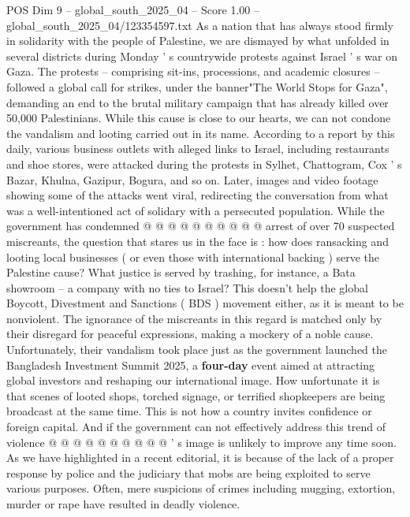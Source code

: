 \begin{textsample}{POS Dim 9 – global\_south\_2025\_04 – Score 1.00 – global\_south\_2025\_04/123354597.txt}  \label{ex:f9_pos_187}
As a nation that has always stood firmly in solidarity with the people of Palestine, we are dismayed by what unfolded in several districts during Monday ' s countrywide protests against Israel ' s war on Gaza.
The protests -- comprising sit-ins, processions, and academic closures -- followed a global call for strikes, under the banner"The World Stops for Gaza", demanding an end to the brutal military campaign that has already killed over 50,000 Palestinians.
While this cause is close to our hearts, we can not condone the vandalism and looting carried out in its name.
According to a report by this daily, various business outlets with alleged links to Israel, including restaurants and shoe stores, were attacked during the protests in Sylhet, Chattogram, Cox ' s Bazar, Khulna, Gazipur, Bogura, and so on.
Later, images and video footage showing some of the attacks went viral, redirecting the conversation from what was a well-intentioned act of solidary with a persecuted population.
While the government has condemned @ @ @ @ @ @ @ @ @ @ arrest of over 70 suspected miscreants, the question that stares us in the face is : how does ransacking and looting local businesses ( or even those with international backing ) serve the Palestine cause?
What justice is served by trashing, for instance, a Bata showroom -- a company with no ties to Israel?
This doesn't help the global Boycott, Divestment and Sanctions ( BDS ) movement either, as it is meant to be nonviolent.
The ignorance of the miscreants in this regard is matched only by their disregard for peaceful expressions, making a mockery of a noble cause.
Unfortunately, their vandalism took place just as the government launched the Bangladesh Investment Summit 2025, a \textbf{four-day} event aimed at attracting global investors and reshaping our international image.
How unfortunate it is that scenes of looted shops, torched signage, or terrified shopkeepers are being broadcast at the same time.
This is not how a country invites confidence or foreign capital.
And if the government can not effectively address this trend of violence @ @ @ @ @ @ @ @ @ @ ' s image is unlikely to improve any time soon.
As we have highlighted in a recent editorial, it is because of the lack of a proper response by police and the judiciary that mobs are being exploited to serve various purposes.
Often, mere suspicions of crimes including mugging, extortion, murder or rape have resulted in deadly violence.

\end{textsample}
